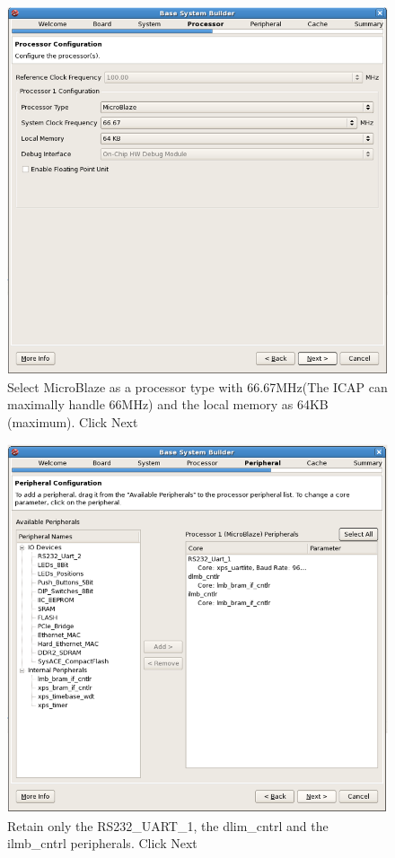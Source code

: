 \documentclass[a4paper,oneside]{memoir}
\begin{document}
\begin{figure}[H]
\centering
\includegraphics[scale=0.4]{step5}
\caption{Select MicroBlaze as a processor type with 66.67MHz(The ICAP can maximally handle 66MHz) and the local memory as 64KB (maximum). Click Next\label{fig:step5}}
\end{figure}
\begin{figure}[H]
\centering
\includegraphics[scale=0.4]{step6}
\caption{Retain only the RS232\_UART\_1, the dlim\_cntrl and the ilmb\_cntrl peripherals. Click Next\label{fig:step6}}
\end{figure}
\end{document}
